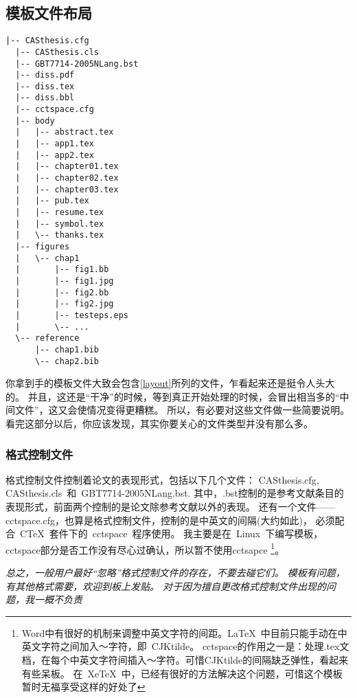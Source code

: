 \subsection{模板文件布局}
\label{sec:layout}

\begin{lstlisting}[title={模板文件布局},label=layout,float,numbers=none]
  |-- CASthesis.cfg
  |-- CASthesis.cls
  |-- GBT7714-2005NLang.bst
  |-- diss.pdf
  |-- diss.tex
  |-- diss.bbl
  |-- cctspace.cfg
  |-- body
  |   |-- abstract.tex
  |   |-- app1.tex
  |   |-- app2.tex
  |   |-- chapter01.tex
  |   |-- chapter02.tex
  |   |-- chapter03.tex
  |   |-- pub.tex
  |   |-- resume.tex
  |   |-- symbol.tex
  |   \-- thanks.tex
  |-- figures
  |   \-- chap1
  |       |-- fig1.bb
  |       |-- fig1.jpg
  |       |-- fig2.bb
  |       |-- fig2.jpg
  |       |-- testeps.eps
  |       \-- ...
  \-- reference
      |-- chap1.bib
      \-- chap2.bib
\end{lstlisting}

你拿到手的模板文件大致会包含\ref{layout}所列的文件，乍看起来还是挺令人头大的。
并且，这还是“干净”的时候，等到真正开始处理的时候，会冒出相当多的“中间文件”，这又会使情况变得更糟糕。
所以，有必要对这些文件做一些简要说明。
看完这部分以后，你应该发现，其实你要关心的文件类型并没有那么多。

\subsubsection{格式控制文件}
\label{sec:format}

格式控制文件控制着论文的表现形式，包括以下几个文件：
CASthesis.cfg, CASthesis.cls~和~GBT7714-2005NLang.bst.
其中，.bst控制的是参考文献条目的表现形式，前面两个控制的是论文除参考文献以外的表现。
还有一个文件——cctspace.cfg，也算是格式控制文件，控制的是中英文的间隔(大约如此)，
必须配合~C\TeX~套件下的~cctspace~程序使用。
我主要是在~Linux~下编写模板，cctspace部分是否工作没有尽心过确认，所以暂不使用cctsapce
\footnote{Word中有很好的机制来调整中英文字符的间距。\LaTeX~中目前只能手动在中英文字符之间加入～字符，即~CJKtilde。
  cctspace的作用之一是：处理.tex文档，在每个中英文字符间插入～字符。可惜CJKtilde的间隔缺乏弹性，看起来有些呆板。
  在~XeTeX~中，已经有很好的方法解决这个问题，可惜这个模板暂时无福享受这样的好处了}。

\emph{\large 总之，一般用户最好``忽略''格式控制文件的存在，不要去碰它们。
   模板有问题，有其他格式需要，欢迎到板上发贴。
   对于因为擅自更改格式控制文件出现的问题，我一概不负责 {\LARGE\Smiley}
 }

